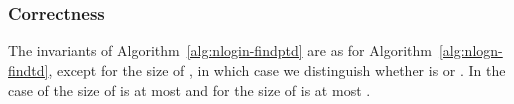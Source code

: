 \documentclass[a4paper,11pt]{article}
\theoremstyle{definition}
\theoremstyle{remark}
\begin{document}
\begin{algorithm}[h!]
 
\Indp
  \BlankLine
  \\
  \\
  
  
  \eIf{}{
    \\
     }{
    \\
     }

  \\
\\
  
  
  \While{}{
    \\
    \\
  }
  
  \\
  \\
  \\
  \\
  \For{}{
    \\
    \\
  }
  \\
  
    
  \For{}{
    \\
    \\
    \\
     }
  
  
  
   \\
  \\
  \\
    \KwRet 
 
  \caption{}
  \label{alg:nlogin-findptd}
\end{algorithm}

\subsubsection{Correctness}
The invariants of Algorithm~\ref{alg:nlogin-findptd} are as for
Algorithm~\ref{alg:nlogn-findtd}, except for the size of , in which
case we distinguish whether  is  or .  In the case of
 the size of  is at most  and for  the size of  is
at most .
\end{document}
